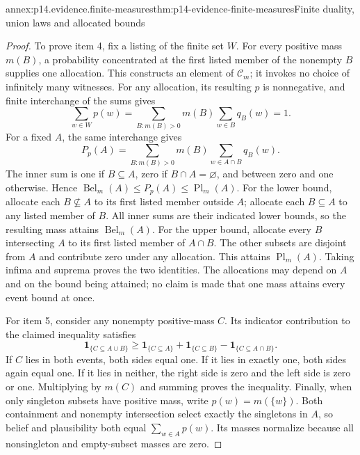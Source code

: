 \begin{annexitem}{annex:p14.evidence.finite-measures}{thm:p14-evidence-finite-measures}{Finite duality, union laws and allocated bounds}
\begin{proof}
To prove item 4, fix a listing of the finite set \(W\). For every positive
mass \(m(B)\), a probability concentrated at the first listed member of
the nonempty \(B\) supplies one allocation. This constructs an element
of \(\mathcal C_m\); it invokes no choice of infinitely many witnesses.
For any allocation, its resulting \(p\) is nonnegative, and finite
interchange of the sums gives
\[
 \sum_{w\in W}p(w)
 =\sum_{B:m(B)>0}m(B)\sum_{w\in B}q_B(w)=1.
\]
For a fixed \(A\), the same interchange gives
\[
 P_p(A)=\sum_{B:m(B)>0}m(B)\sum_{w\in A\cap B}q_B(w).
\]
The inner sum is one if \(B\subseteq A\), zero if
\(B\cap A=\varnothing\), and between zero and one otherwise. Hence
\(\operatorname{Bel}_m(A)\leq P_p(A)\leq\operatorname{Pl}_m(A)\).
For the lower bound, allocate each \(B\not\subseteq A\) to its first
listed member outside \(A\); allocate each \(B\subseteq A\) to any
listed member of \(B\). All inner sums are their indicated lower bounds,
so the resulting mass attains \(\operatorname{Bel}_m(A)\).
For the upper bound, allocate every \(B\) intersecting \(A\) to its
first listed member of \(A\cap B\). The other subsets are disjoint from
\(A\) and contribute zero under any allocation. This attains
\(\operatorname{Pl}_m(A)\). Taking infima and suprema proves the two
identities. The allocations may depend on \(A\) and on the bound being
attained; no claim is made that one mass attains every event bound at once.

For item 5, consider any nonempty positive-mass \(C\). Its indicator
contribution to the claimed inequality satisfies
\[
 \mathbf1_{\{C\subseteq A\cup B\}}
 \geq \mathbf1_{\{C\subseteq A\}}+
        \mathbf1_{\{C\subseteq B\}}-
        \mathbf1_{\{C\subseteq A\cap B\}}.
\]
If \(C\) lies in both events, both sides equal one. If it lies in exactly
one, both sides again equal one. If it lies in neither, the right side is
zero and the left side is zero or one. Multiplying by \(m(C)\) and
summing proves the inequality. Finally, when only singleton subsets have
positive mass, write \(p(w)=m(\{w\})\). Both containment and nonempty
intersection select exactly the singletons in \(A\), so belief and
plausibility both equal \(\sum_{w\in A}p(w)\). Its masses normalize
because all nonsingleton and empty-subset masses are zero.
\end{proof}
\end{annexitem}

